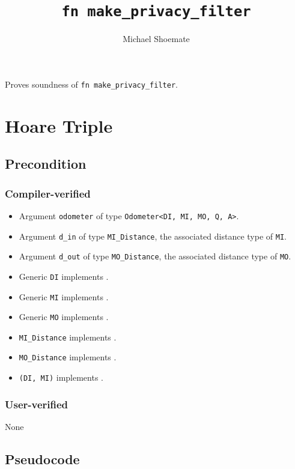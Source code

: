 \documentclass{article}
\title{\texttt{fn make\_privacy\_filter}}
\author{Michael Shoemate}
\date{}
\begin{document}
\maketitle

\contrib
Proves soundness of \texttt{fn make\_privacy\_filter}.

\section{Hoare Triple}
\subsection*{Precondition}
\subsubsection*{Compiler-verified}
\begin{itemize}
    \item Argument \texttt{odometer} of type \texttt{Odometer<DI, MI, MO, Q, A>}.
    \item Argument \texttt{d\_in} of type \texttt{MI\_Distance}, the associated distance type of \texttt{MI}.
    \item Argument \texttt{d\_out} of type \texttt{MO\_Distance}, the associated distance type of \texttt{MO}.
    \item Generic \texttt{DI} implements .
    \item Generic \texttt{MI} implements .
    \item Generic \texttt{MO} implements .
    \item \texttt{MI\_Distance} implements .
    \item \texttt{MO\_Distance} implements .
    \item \texttt{(DI, MI)} implements .
\end{itemize}

\subsubsection*{User-verified}
None

\subsection*{Pseudocode}

\end{document}
